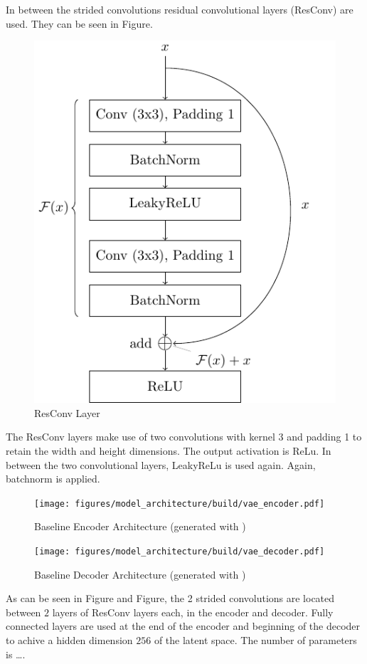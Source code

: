 In between the strided convolutions residual convolutional layers (ResConv) \parencite{ResNet} are used.
They can be seen in Figure.
\begin{figure}[h!]
    \centering
    \includegraphics[]{figures/model_architecture/build/residual_conv_layer.pdf}
    \caption{ResConv Layer \parencite{ResNet}}
\end{figure}
The ResConv layers make use of two convolutions with kernel 3 and padding 1 to retain the width and height dimensions.
The output activation is ReLu.
In between the two convolutional layers, LeakyReLu is used again.
Again, batchnorm is applied.
\begin{figure}[h!]
    \centering
    \texttt{[image: figures/model\_architecture/build/vae\_encoder.pdf]}
    \caption{Baseline Encoder Architecture (generated with \parencite{NNVisualization})}
\end{figure}
\begin{figure}[h!]
    \centering
    \texttt{[image: figures/model\_architecture/build/vae\_decoder.pdf]}
    \caption{Baseline Decoder Architecture (generated with \parencite{NNVisualization})}
\end{figure}
As can be seen in Figure and Figure, the 2 strided convolutions are located between $2$ layers of ResConv layers each, in the encoder and decoder.
Fully connected layers are used at the end of the encoder and beginning of the decoder to achive a hidden dimension $256$ of the latent space. 
The number of parameters is \dots.

